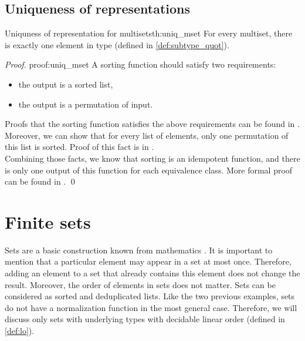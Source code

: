 \subsection{Uniqueness of representations}
\begin{theo}{Uniquness of representation for multisets}{th:uniq_mset}
For every multiset, there is exactly one element in  type (defined in \ref{def:subtype_quot}). 
\end{theo}
\begin{proof}{}{proof:uniq_mset}
A sorting function should satisfy two requirements:
\begin{itemize}
    \itemsep 0em 
    \item the output is a sorted list,
    \item the output is a permutation of input.
\end{itemize}
Proofs that the sorting function satisfies the above requirements can be found in .\\
Moreover, we can show that for every list of elements, only one permutation of this list is sorted. Proof of this fact is in .\\
Combining those facts, we know that sorting is an idempotent function, and there is only one output of this function for each equivalence class. More formal proof can be found in . \qed
\end{proof}
\section{Finite sets}
Sets are a basic construction known from mathematics \cite{SetTheorey}. It is important to mention that a particular element may appear in a set at most once. Therefore, adding an element to a set that already contains this element does not change the result. Moreover,  the order of elements in sets does not matter. Sets can be considered as sorted and deduplicated lists. Like the two previous examples, sets do not have a normalization function in the most general case. Therefore, we will discuss only sets with underlying types with decidable linear order (defined in \ref{def:lo}).
